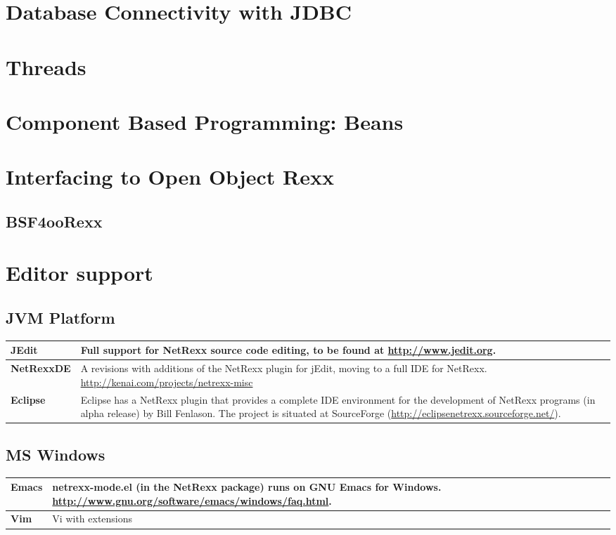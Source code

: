 \documentclass[10pt]{book}
\begin{document}
\chapter{Database Connectivity with JDBC}

\chapter{Threads}

\chapter{Component Based Programming: Beans}

\chapter{Interfacing to Open Object Rexx}
\section{BSF4ooRexx}

\chapter{Editor support}\label{editors}
\section{JVM Platform}
\begin{tabularx}{\textwidth}{>{\bfseries}lX}
\toprule
JEdit & Full support for NetRexx source code editing, to be found at
\url{http://www.jedit.org}.
\\\midrule
NetRexxDE & A revisions with additions of the NetRexx plugin for
jEdit, moving to a full IDE for NetRexx. \url{http://kenai.com/projects/netrexx-misc} 
\\\midrule
Eclipse & Eclipse has a NetRexx plugin that provides a complete IDE
environment for the development of NetRexx programs (in alpha release)
by Bill Fenlason. The project is situated at SourceForge (\url{http://eclipsenetrexx.sourceforge.net/}).
\\\bottomrule
\end{tabularx}
\section{MS Windows}
\begin{tabularx}{\textwidth}{>{\bfseries}lX}
\toprule
Emacs & netrexx-mode.el (in the NetRexx package) runs on GNU Emacs for
Windows. \url{http://www.gnu.org/software/emacs/windows/faq.html}.
\\\midrule
Vim & Vi with extensions
\\\bottomrule
\end{tabularx}
\backmatter
\listoffigures
\listoftables
\printindex
\end{document}
